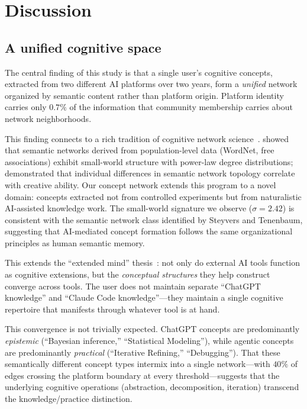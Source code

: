 \documentclass[11pt,twocolumn]{article}
\begin{document}
\section{Discussion}
\label{sec:discussion}

\subsection{A unified cognitive space}

The central finding of this study is that a single user's cognitive concepts, extracted from two different AI platforms over two years, form a \emph{unified} network organized by semantic content rather than platform origin.
Platform identity carries only $0.7\%$ of the information that community membership carries about network neighborhoods.

This finding connects to a rich tradition of cognitive network science~\citep{siew2019cognitive}.
\citet{steyvers2005large} showed that semantic networks derived from population-level data (WordNet, free associations) exhibit small-world structure with power-law degree distributions; \citet{kenett2014investigating} demonstrated that individual differences in semantic network topology correlate with creative ability.
Our concept network extends this program to a novel domain: concepts extracted not from controlled experiments but from naturalistic AI-assisted knowledge work.
The small-world signature we observe ($\sigma = 2.42$) is consistent with the semantic network class identified by Steyvers and Tenenbaum, suggesting that AI-mediated concept formation follows the same organizational principles as human semantic memory.

This extends the ``extended mind'' thesis~\citep{clark1998extended,hutchins1995cognition}: not only do external AI tools function as cognitive extensions, but the \emph{conceptual structures} they help construct converge across tools.
The user does not maintain separate ``ChatGPT knowledge'' and ``Claude Code knowledge''---they maintain a single cognitive repertoire that manifests through whatever tool is at hand.

This convergence is not trivially expected.
ChatGPT concepts are predominantly \emph{epistemic} (``Bayesian inference,'' ``Statistical Modeling''), while agentic concepts are predominantly \emph{practical} (``Iterative Refining,'' ``Debugging'').
That these semantically different concept types intermix into a single network---with $40\%$ of edges crossing the platform boundary at every threshold---suggests that the underlying cognitive operations (abstraction, decomposition, iteration) transcend the knowledge/practice distinction.
\end{document}
